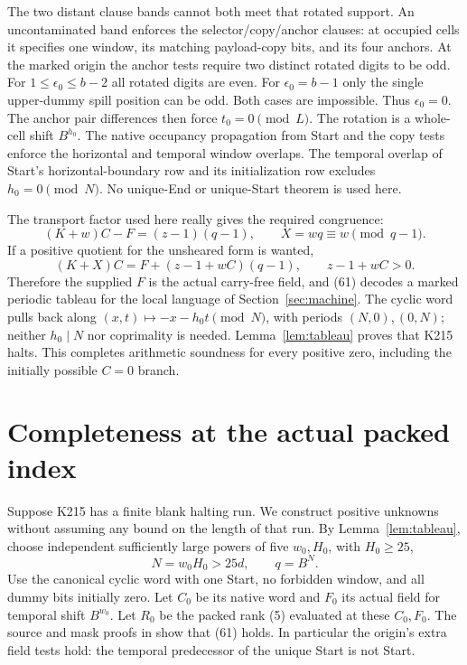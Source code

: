 \documentclass[11pt,a4paper]{article}
\theoremstyle{definition}
\theoremstyle{remark}
\begin{document}
The two distant clause bands cannot both meet that rotated support.
An uncontaminated band enforces the selector/copy/anchor clauses:
at occupied cells it specifies one window, its matching
payload-copy bits, and its four anchors. At the marked origin the
anchor tests require two distinct rotated digits to be odd.
For \(1\le\epsilon_0\le b-2\) all rotated digits are even.
For \(\epsilon_0=b-1\) only the single upper-dummy spill position
can be odd. Both cases are impossible.
Thus \(\epsilon_0=0\). The anchor pair differences then force
\(t_0=0\pmod L\). The rotation is a whole-cell shift \(B^{h_0}\).
The native occupancy propagation from Start and the copy tests
enforce the horizontal and temporal window overlaps.
The temporal overlap of Start's horizontal-boundary row and its
initialization row excludes \(h_0=0\pmod N\).
No unique-End or unique-Start theorem is used here.

The transport factor used here really gives the required congruence:
\[
 (K+w)C-F=(z-1)(q-1),\qquad X=wq\equiv w\pmod{q-1}. \tag{62}
\]
If a positive quotient for the unsheared form is wanted,
\[
 (K+X)C=F+(z-1+wC)(q-1),\qquad z-1+wC>0. \tag{63}
\]
Therefore the supplied \(F\) is the actual carry-free field,
and (61) decodes a marked periodic tableau for the local language
of Section~\ref{sec:machine}. The cyclic word pulls back along
\((x,t)\mapsto-x-h_0t\pmod N\), with periods \((N,0),(0,N)\);
neither \(h_0\mid N\) nor coprimality is needed.
Lemma~\ref{lem:tableau} proves that K215 halts. This completes
arithmetic soundness for every positive zero, including the
initially possible \(C=0\) branch.

\section{Completeness at the actual packed index}\label{sec:complete}
Suppose K215 has a finite blank halting run. We construct positive
unknowns without assuming any bound on the length of that run.
By Lemma~\ref{lem:tableau}, choose independent sufficiently large
powers of five \(w_0,H_0\), with \(H_0\ge25\),
\[
 N=w_0H_0>25d,\qquad q=B^N. \tag{64}
\]
Use the canonical cyclic word with one Start, no forbidden window,
and all dummy bits initially zero. Let \(C_0\) be its native word
and \(F_0\) its actual field for temporal shift \(B^{w_0}\).
Let \(R_0\) be the packed rank (5) evaluated at these \(C_0,F_0\).
The source and mask proofs in \cite{compiler75} show that (61)
holds. In particular the origin's extra field tests hold: the
temporal predecessor of the unique Start is not Start.
\end{document}
